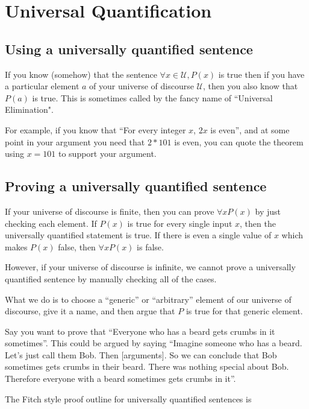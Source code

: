 \newpage

\section{Universal Quantification}

\subsection{Using a universally quantified sentence}

If you know (somehow) that the sentence $\forall x \in \mathcal{U}, P(x)$ is true then if you have a particular element $a$ of your universe of discourse $\mathcal{U}$, then you also know that $P(a)$ is true.  This is sometimes called by the fancy name of ``Universal Elimination".

For example, if you know that ``For every integer $x$, $2x$ is even'', and at some point in your argument you need that $2*101$ is even, you can  quote the theorem using $x = 101$ to support your argument.

\subsection{Proving a universally quantified sentence}

If your universe of discourse is finite, then you can prove $\forall x P(x)$ by just checking each element.  If $P(x)$ is true for every single input $x$, then the universally quantified statement is true.  If there is even a single value of $x$ which makes $P(x)$ false, then $\forall x P(x)$ is false.

However, if your universe of discourse is infinite, we cannot prove a universally quantified sentence by manually checking all of the cases.  

What we do is to choose a ``generic'' or ``arbitrary'' element of our universe of discourse, give it a name, and then argue that $P$ is true for that generic element.

Say you want to prove that ``Everyone who has a beard gets crumbs in it sometimes''.  This could be argued by saying ``Imagine someone who has a beard. Let's just call them Bob.  Then [arguments].  So we can conclude that Bob sometimes gets crumbs in their beard.  There was nothing special about Bob.  Therefore everyone with a beard sometimes gets crumbs in it''.

The Fitch style proof outline for universally quantified sentences is 


